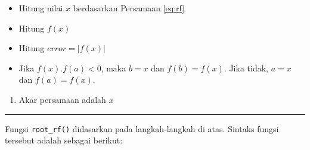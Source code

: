 \documentclass[]{book}
\providecommand{\tightlist}{%
  \setlength{\itemsep}{0pt}\setlength{\parskip}{0pt}}
\theoremstyle{definition}
\theoremstyle{definition}
\theoremstyle{definition}
\theoremstyle{remark}
\begin{document}
\begin{itemize}
\tightlist
\item
  Hitung nilai \(x\) berdasarkan Persamaan \eqref{eq:rf}
\item
  Hitung \(f\left(x \right)\)
\item
  Hitung \(error=\left|f\left(x \right) \right|\)
\item
  Jika \(f\left(x \right).f\left(a \right)<0\), maka \(b=x\) dan \(f\left(b \right)=f\left(x \right)\). Jika tidak, \(a=x\) dan \(f\left(a \right)=f\left(x \right)\).
\end{itemize}

\begin{enumerate}
\def\labelenumi{\arabic{enumi}.}
\setcounter{enumi}{5}
\tightlist
\item
  Akar persamaan adalah \(x\)
\end{enumerate}

\begin{center}\rule{0.5\linewidth}{\linethickness}\end{center}

Fungsi \texttt{root\_rf()} didasarkan pada langkah-langkah di atas. Sintaks fungsi tersebut adalah sebagai berikut:
\end{document}
